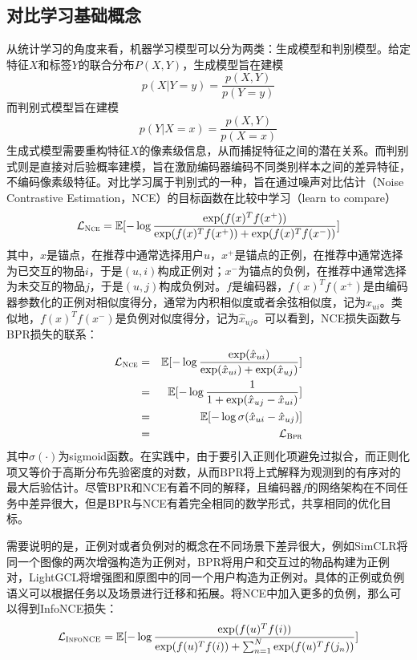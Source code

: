 \subsection{对比学习基础概念}
从统计学习的角度来看，机器学习模型可以分为两类：生成模型和判别模型\cite{li:2019}。给定特征$X$和标签$Y$的联合分布$P(X,Y)$，生成模型旨在建模
\[p(X|Y=y)= \frac{p(X,Y)}{p(Y=y)}\]
而判别式模型旨在建模
\[p(Y|X=x)= \frac{p(X,Y)}{p(X=x)}\]
生成式模型需要重构特征$X$的像素级信息，从而捕捉特征之间的潜在关系。而判别式则是直接对后验概率建模，旨在激励编码器编码不同类别样本之间的差异特征，不编码像素级特征。对比学习属于判别式的一种，旨在通过噪声对比估计（Noise Contrastive Estimation，NCE）\cite{Gutmann:2010:ICAIS}的目标函数在比较中学习（learn to compare）
\begin{eqnarray}
\mathcal{L}_\textsc{Nce} = \mathbb E[-\log \frac{\exp(f(x)^Tf(x^+))}{\exp(f(x)^Tf(x^+))+\exp(f(x)^Tf(x^-))}]
\end{eqnarray}
其中，$x$是锚点，在推荐中通常选择用户$u$，$x^+$是锚点的正例，在推荐中通常选择为已交互的物品$i$，于是$(u,i)$构成正例对；$x^-$为锚点的负例，在推荐中通常选择为未交互的物品$j$，于是$(u,j)$构成负例对。$f$是编码器，$f(x)^Tf(x^+)$是由编码器参数化的正例对相似度得分，通常为内积相似度或者余弦相似度，记为$\hat{x}_{ui}$。类似地，$f(x)^Tf(x^-)$是负例对似度得分，记为$\hat{x}_{uj}$。可以看到，NCE损失函数与BPR损失\cite{Steffen:2009:UAI}的联系：
\begin{eqnarray}
	\mathcal{L}_\textsc{Nce} 
	&=& \mathbb E[-\log\frac{\exp(\hat{x}_{ui})}{\exp(\hat{x}_{ui})+\exp(\hat{x}_{uj})}]\nonumber \\
	&=& \mathbb E[-\log\frac{1}{1+\exp(\hat{x}_{uj}-\hat{x}_{ui})}]\nonumber \\
	&=& \mathbb E[-\log \sigma (\hat{x}_{ui} - \hat{x}_{uj})]\nonumber \\
	&=& \mathcal{L}_\textsc{Bpr} 
\end{eqnarray}
其中$\sigma(\cdot)$为sigmoid函数。在实践中，由于要引入正则化项避免过拟合，而正则化项又等价于高斯分布先验密度的对数，从而BPR将上式解释为观测到的有序对的最大后验估计。尽管BPR和NCE有着不同的解释，且编码器$f$的网络架构在不同任务中差异很大，但是BPR与NCE有着完全相同的数学形式，共享相同的优化目标。

需要说明的是，正例对或者负例对的概念在不同场景下差异很大，例如SimCLR\cite{Chen:2020:ICML}将同一个图像的两次增强构造为正例对，BPR\cite{Steffen:2009:UAI}将用户和交互过的物品构建为正例对，LightGCL\cite{lightgcl:2023:ICLR}将增强图和原图中的同一个用户构造为正例对。具体的正例或负例语义可以根据任务以及场景进行迁移和拓展。将NCE中加入更多的负例，那么可以得到InfoNCE损失\cite{Oord:2018:arxiv}：
\begin{eqnarray}
	\mathcal{L}_\textsc{InfoNCE} = \mathbb E[-\log \frac{\exp(f(u)^Tf(i))}{\exp(f(u)^Tf(i))+\sum_{n=1}^{N}\exp(f(u)^Tf(j_n))}]
\end{eqnarray}

